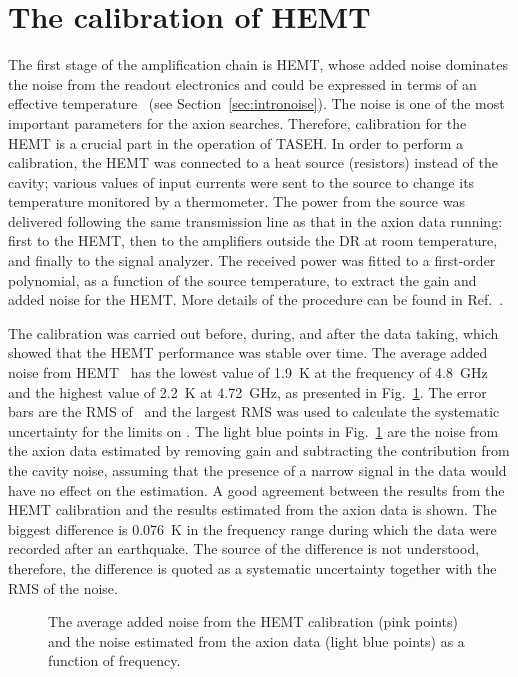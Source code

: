 \section{The calibration of HEMT}
\label{sec:hemtcalibration}

The first stage of the amplification chain is HEMT, whose added noise 
dominates the noise from the readout electronics and could be 
expressed in terms of an effective temperature \ta\ 
(see Section~\ref{sec:intronoise}). The noise is one of the most important 
parameters for the axion searches. Therefore, calibration for the HEMT is a 
crucial part in the operation of TASEH. In order to perform a calibration, 
the HEMT was connected to a heat source (resistors) instead of the cavity; 
various values of input currents were sent to the source to change its 
temperature monitored by a thermometer. The power from the source 
was delivered following the same transmission line as that in the axion 
data running: first to the HEMT, then to the amplifiers outside the DR at room 
temperature, and finally to the signal analyzer. The received power was 
fitted to a first-order polynomial, as a function of the source temperature, 
to extract the gain and added noise for the HEMT. More details of the 
procedure can be found in Ref.~\cite{TASEHInstrumentation}. 

The calibration was carried out before, 
during, and after the data taking, which showed that the HEMT performance 
was stable over time. The average added noise from HEMT \ta\ has the 
lowest value of 1.9~K at the frequency of 4.8~GHz and the highest value of 
2.2~K at 4.72~GHz, as presented in Fig.~\ref{fig:hemtcalvsf}. 
The error bars are the RMS of \ta\ and the largest RMS was used to calculate 
the systematic uncertainty for the limits on \gagg. The light blue points in 
Fig.~\ref{fig:hemtcalvsf} are the noise from the axion data estimated by 
removing gain and subtracting the contribution from the cavity noise, assuming 
that the presence of a narrow signal in the data would have no effect on the 
estimation. A good agreement between the results from the HEMT calibration  
and the results estimated from the axion data is shown. The biggest 
difference is 0.076~K in the frequency range during which the data were 
recorded after an earthquake. The source of the difference is not understood, 
therefore, the difference is quoted as a systematic uncertainty together 
with the RMS of the noise.

\begin{figure} [htbp]
  \centering
  \caption{The average added noise from the HEMT calibration (pink points) and 
 the noise estimated from the axion data (light blue points) as a function of frequency.}
  \label{fig:hemtcalvsf}
\end{figure}


  


